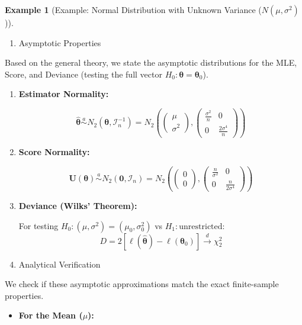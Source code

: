 \documentclass[
  letterpaper,
  DIV=11,
  numbers=noendperiod]{scrreprt}
\providecommand{\tightlist}{%
  \setlength{\itemsep}{0pt}\setlength{\parskip}{0pt}}
\renewcommand{\[}{\begin{equation}}
\renewcommand{\]}{\end{equation}}
\theoremstyle{definition}
\theoremstyle{plain}
\theoremstyle{plain}
\theoremstyle{plain}
\theoremstyle{definition}
\newtheorem{example}{Example}[chapter]
\theoremstyle{plain}
\theoremstyle{remark}
\begin{document}
\begin{example}[Example: Normal Distribution with Unknown Variance
(\(N(\mu, \sigma^2)\))]
\begin{enumerate}
\def\labelenumi{\arabic{enumi}.}
\setcounter{enumi}{1}
\tightlist
\item
  Asymptotic Properties
\end{enumerate}

Based on the general theory, we state the asymptotic distributions for
the MLE, Score, and Deviance (testing the full vector
\(H_0: \boldsymbol{\theta} = \boldsymbol{\theta}_0\)).

\begin{enumerate}
\def\labelenumi{\arabic{enumi}.}
\item
  \textbf{Estimator Normality:}

  \[
  \hat{\boldsymbol{\theta}} \overset{a}{\sim} N_2\left( \boldsymbol{\theta}, \mathcal{I}_n^{-1} \right) = N_2\left( \begin{pmatrix} \mu \\ \sigma^2 \end{pmatrix}, \begin{pmatrix} \frac{\sigma^2}{n} & 0 \\ 0 & \frac{2\sigma^4}{n} \end{pmatrix} \right)
  \]
\item
  \textbf{Score Normality:}

  \[
  \mathbf{U}(\boldsymbol{\theta}) \overset{a}{\sim} N_2\left( \mathbf{0}, \mathcal{I}_n \right) = N_2\left( \begin{pmatrix} 0 \\ 0 \end{pmatrix}, \begin{pmatrix} \frac{n}{\sigma^2} & 0 \\ 0 & \frac{n}{2\sigma^4} \end{pmatrix} \right)
  \]
\item
  \textbf{Deviance (Wilks' Theorem):}

  For testing \(H_0: (\mu, \sigma^2) = (\mu_0, \sigma_0^2)\) vs
  \(H_1: \text{unrestricted}\): \[
  D = 2[\ell(\hat{\boldsymbol{\theta}}) - \ell(\boldsymbol{\theta}_0)] \xrightarrow{d} \chi^2_2
  \]
\item
  Analytical Verification
\end{enumerate}

We check if these asymptotic approximations match the exact
finite-sample properties.

\begin{itemize}
\tightlist
\item
  \textbf{For the Mean (\(\mu\)):}


\end{itemize}
\end{example}
\end{document}
